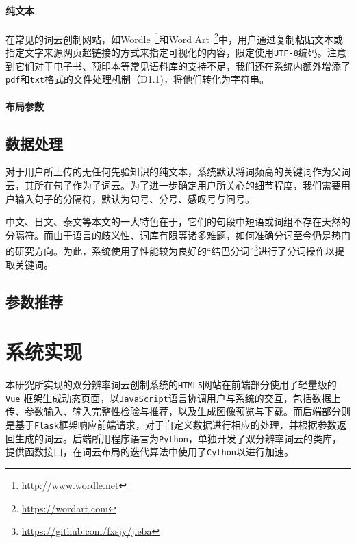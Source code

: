 \paragraph {\textbf{纯文本}}
在常见的词云创制网站，如Wordle~\footnote{\url{http://www.wordle.net}}和Word Art~\footnote{\url{https://wordart.com}}中，用户通过复制粘贴文本或指定文字来源网页超链接的方式来指定可视化的内容，限定使用\texttt{UTF-8}编码。注意到它们对于电子书、预印本等常见语料库的支持不足，我们还在系统内额外增添了\texttt{pdf}和\texttt{txt}格式的文件处理机制（D1.1)，将他们转化为字符串。


\paragraph{\textbf{布局参数}}

\subsection{数据处理}
对于用户所上传的无任何先验知识的纯文本，系统默认将词频高的关键词作为父词云，其所在句子作为子词云。为了进一步确定用户所关心的细节程度，我们需要用户输入句子的分隔符，默认为句号、分号、感叹号与问号。

中文、日文、泰文等本文的一大特色在于，它们的句段中短语或词组不存在天然的分隔符。而由于语言的歧义性、词库有限等诸多难题，如何准确分词至今仍是热门的研究方向。为此，系统使用了性能较为良好的``结巴分词''\footnote{\url{https://github.com/fxsjy/jieba}}进行了分词操作以提取关键词。

\subsection{参数推荐}




\section{系统实现}
本研究所实现的双分辨率词云创制系统的\texttt{HTML5}网站在前端部分使用了轻量级的\texttt{Vue} 框架生成动态页面，以\texttt{JavaScript}语言协调用户与系统的交互，包括数据上传、参数输入、输入完整性检验与推荐，以及生成图像预览与下载。而后端部分则是基于\texttt{Flask}框架响应前端请求，对于自定义数据进行相应的处理，并根据参数返回生成的词云。后端所用程序语言为\texttt{Python}，单独开发了双分辨率词云的类库，提供函数接口，在词云布局的迭代算法中使用了\texttt{Cython}以进行加速。


